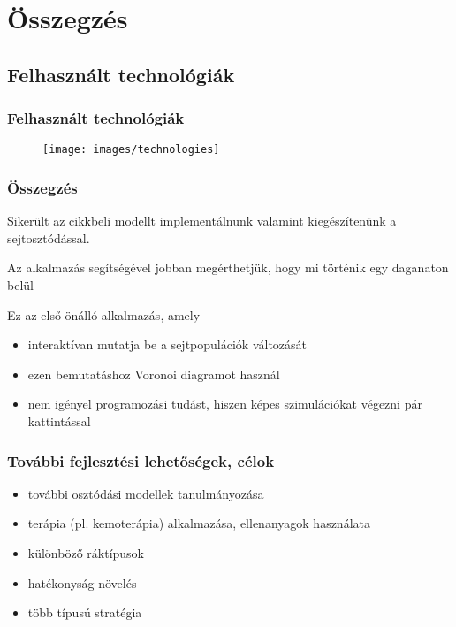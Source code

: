 \section{Összegzés}

\subsection{Felhasznált technológiák}
\begin{frame}
	\frametitle{Felhasznált technológiák}
	\begin{figure}[ht!]
		\centering
		\texttt{[image: images/technologies]}
	\end{figure}
\end{frame}

\begin{frame}
\frametitle{Összegzés}

\begin{block}{}
Sikerült az \cite{archetti2016cooperation} cikkbeli modellt implementálnunk valamint kiegészítenünk a sejtosztódással.
\end{block}
\begin{block}{}
Az alkalmazás segítségével jobban megérthetjük, hogy mi történik egy daganaton belül
\end{block}

\pause
\begin{block}{Ez az első önálló alkalmazás, amely}
\begin{itemize}
	\item interaktívan mutatja be a sejtpopulációk változását
	\pause
	\item ezen bemutatáshoz Voronoi diagramot használ
	\pause
	\item nem igényel programozási tudást, hiszen képes szimulációkat végezni pár kattintással
\end{itemize}
\end{block}
\end{frame}

\begin{frame}
\frametitle{További fejlesztési lehetőségek, célok}
\begin{itemize}
	\item további osztódási modellek tanulmányozása
	\item terápia (pl. kemoterápia) alkalmazása, ellenanyagok használata
	\item különböző ráktípusok
	\item hatékonyság növelés
	\item több típusú stratégia
\end{itemize}

\end{frame}